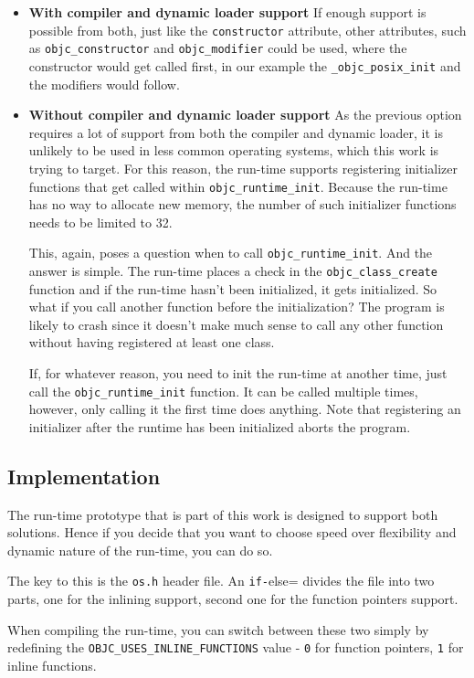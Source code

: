 \begin{itemize}
  \item{\bf{With compiler and dynamic loader support}} If enough support is possible from both, just like the \verb=constructor= attribute, other attributes, such as \verb=objc_constructor= and \verb=objc_modifier= could be used, where the constructor would get called first, in our example the \verb=_objc_posix_init= and the modifiers would follow.
  \item{\bf{Without compiler and dynamic loader support}} As the previous option requires a lot of support from both the compiler and dynamic loader, it is unlikely to be used in less common operating systems, which this work is trying to target. For this reason, the run-time supports registering initializer functions that get called within \verb=objc_runtime_init=. Because the run-time has no way to allocate new memory, the number of such initializer functions needs to be limited to 32.
  
  This, again, poses a question when to call \verb=objc_runtime_init=. And the answer is simple. The run-time places a check in the \verb=objc_class_create= function and if the run-time hasn't been initialized, it gets initialized. So what if you call another function before the initialization? The program is likely to crash since it doesn't make much sense to call any other function without having registered at least one class.
  
  If, for whatever reason, you need to init the run-time at another time, just call the \verb=objc_runtime_init= function. It can be called multiple times, however, only calling it the first time does anything. Note that registering an initializer after the runtime has been initialized aborts the program.
\end{itemize}

\subsection{Implementation}

The run-time prototype that is part of this work is designed to support both solutions. Hence if you decide that you want to choose speed over flexibility and dynamic nature of the run-time, you can do so.

The key to this is the \verb=os.h= header file. An \verb#if-#else= divides the file into two parts, one for the inlining support, second one for the function pointers support.

When compiling the run-time, you can switch between these two simply by redefining the \verb=OBJC_USES_INLINE_FUNCTIONS= value - \verb=0= for function pointers, \verb=1= for inline functions.

